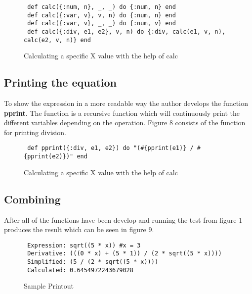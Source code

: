 \documentclass[a4paper,11pt]{article}
\begin{document}
\begin{figure}[!ht]
\begin{verbatim}
 def calc({:num, n}, _, _) do {:num, n} end
 def calc({:var, v}, v, n) do {:num, n} end
 def calc({:var, v}, _, _) do {:num, v} end
 def calc({:div, e1, e2}, v, n) do {:div, calc(e1, v, n), calc(e2, v, n)} end
\end{verbatim}
\caption{Calculating a specific X value with the help of calc}
\label{Figure:7}
\end{figure}


\subsection*{Printing the equation}
To show the expression in a more readable way the author develops the function \textbf{pprint}. The function is a recursive function which will continuously print the different variables depending on the operation. Figure 8 consists of the function for printing division.

\begin{figure}[!ht]
\begin{verbatim}
 def pprint({:div, e1, e2}) do "(#{pprint(e1)} / #{pprint(e2)})" end
\end{verbatim}
\caption{Calculating a specific X value with the help of calc}
\label{Figure:8}
\end{figure}

\subsection*{Combining}
After all of the functions have been develop and running the test from figure 1 produces the result which can be seen in figure 9.

\begin{figure}[!ht]
\begin{verbatim}
 Expression: sqrt((5 * x)) #x = 3
 Derivative: (((0 * x) + (5 * 1)) / (2 * sqrt((5 * x))))
 Simplified: (5 / (2 * sqrt((5 * x))))
 Calculated: 0.6454972243679028
\end{verbatim}
\caption{Sample Printout}
\label{Figure:9}
\end{figure}
\end{document}
